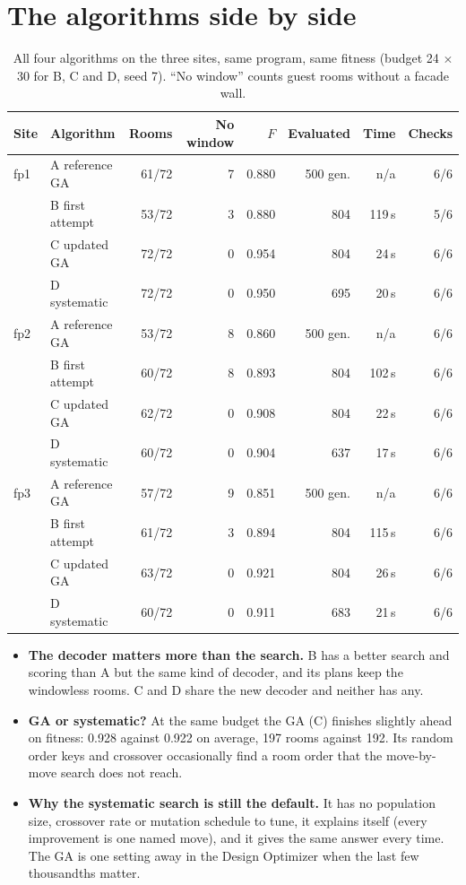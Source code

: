 \documentclass[10pt,a4paper]{article}
\begin{document}
\section{The algorithms side by side}
\begin{table}[H]\centering\small\caption{All four algorithms on the three sites, same program, same fitness (budget 24 $\times$ 30 for B, C and D, seed 7). ``No window'' counts guest rooms without a facade wall.}\label{tab:comp}
\begin{tabular}{@{}l l r r r r r r@{}}
\toprule
\textbf{Site} & \textbf{Algorithm} & \textbf{Rooms} & \textbf{No window} & \textbf{$F$} & \textbf{Evaluated} & \textbf{Time} & \textbf{Checks} \\ \midrule
fp1 & A reference GA & 61/72 & 7 & 0.880 & 500 gen. & n/a & 6/6 \\
 & B first attempt & 53/72 & 3 & 0.880 & 804 & 119\,s & 5/6 \\
 & C updated GA & 72/72 & 0 & 0.954 & 804 & 24\,s & 6/6 \\
 & D systematic & 72/72 & 0 & 0.950 & 695 & 20\,s & 6/6 \\ \midrule
fp2 & A reference GA & 53/72 & 8 & 0.860 & 500 gen. & n/a & 6/6 \\
 & B first attempt & 60/72 & 8 & 0.893 & 804 & 102\,s & 6/6 \\
 & C updated GA & 62/72 & 0 & 0.908 & 804 & 22\,s & 6/6 \\
 & D systematic & 60/72 & 0 & 0.904 & 637 & 17\,s & 6/6 \\ \midrule
fp3 & A reference GA & 57/72 & 9 & 0.851 & 500 gen. & n/a & 6/6 \\
 & B first attempt & 61/72 & 3 & 0.894 & 804 & 115\,s & 6/6 \\
 & C updated GA & 63/72 & 0 & 0.921 & 804 & 26\,s & 6/6 \\
 & D systematic & 60/72 & 0 & 0.911 & 683 & 21\,s & 6/6 \\
\bottomrule
\end{tabular}
\end{table}
\begin{itemize}
\item \textbf{The decoder matters more than the search.} B has a better search and scoring than A but the same kind
of decoder, and its plans keep the windowless rooms. C and D share the new decoder and neither has any.
\item \textbf{GA or systematic?} At the same budget the GA (C) finishes slightly ahead on fitness: 0.928 against
0.922 on average, 197 rooms against 192. Its random order keys and crossover occasionally find a room order
that the move-by-move search does not reach.
\item \textbf{Why the systematic search is still the default.} It has no population size, crossover rate or mutation
schedule to tune, it explains itself (every improvement is one named move), and it gives the same answer every time.
The GA is one setting away in the Design Optimizer when the last few thousandths matter.
\end{itemize}
\end{document}
